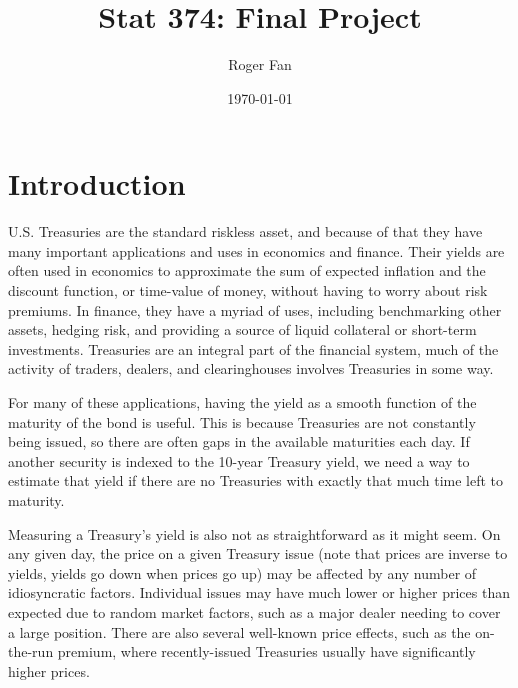 \documentclass[12pt]{article}
\begin{document}

\title{Stat 374: Final Project}
\author{Roger Fan}
\date{\today}

\maketitle



\section{Introduction}

U.S. Treasuries are the standard riskless asset, and because of that they have many important applications and uses in economics and finance. Their yields are often used in economics to approximate the sum of expected inflation and the discount function, or time-value of money, without having to worry about risk premiums. In finance, they have a myriad of uses, including benchmarking other assets, hedging risk, and providing a source of liquid collateral or short-term investments. Treasuries are an integral part of the financial system, much of the activity of traders, dealers, and clearinghouses involves Treasuries in some way.

For many of these applications, having the yield as a smooth function of the maturity of the bond is useful. This is because Treasuries are not constantly being issued, so there are often gaps in the available maturities each day. If another security is indexed to the 10-year Treasury yield, we need a way to estimate that yield if there are no Treasuries with exactly that much time left to maturity.

Measuring a Treasury's yield is also not as straightforward as it might seem. On any given day, the price on a given Treasury issue (note that prices are inverse to yields, yields go down when prices go up) may be affected by any number of idiosyncratic factors. Individual issues may have much lower or higher prices than expected due to random market factors, such as a major dealer needing to cover a large position. There are also several well-known price effects, such as the on-the-run premium, where recently-issued Treasuries usually have significantly higher prices.
\end{document}
